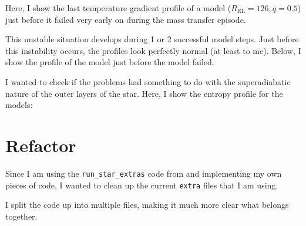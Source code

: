 \documentclass[a4paper,10pt]{article}
\begin{document}
Here, I show the last temperature gradient profile of a model (\(R _\text{RL} = 126, q=0.5\)) just before it failed very early on during the mass transfer episode.
\begin{figure}[ht]
    \centering
\end{figure}

This unstable situation develops during 1 or 2 successful model steps. Just before this instability occurs, the profiles look perfectly normal (at least to me).
Below, I show the profile of the model just before the model failed.
\begin{figure}[ht]
    \centering
\end{figure}

I wanted to check if the problems had something to do with the superadiabatic nature of the outer layers of the star.
Here, I show the entropy profile for the models:
\begin{figure}[ht]
    \centering
\end{figure}

\nextpage
\begin{figure}[ht]
    \centering
\end{figure}

\section{Refactor}

Since I am using the \lstinline[style=output, breaklines=true]|run_star_extras| code from \citet{rees2024b} and implementing my own pieces of code, I wanted to clean up the current \lstinline[style=output, breaklines=true]|extra| files that I am using.

I split the code up into multiple files, making it much more clear what belongs together.
\end{document}
